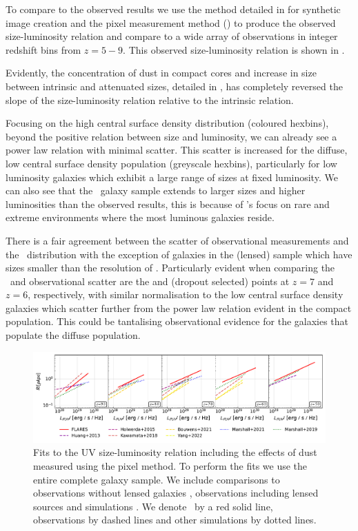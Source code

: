 To compare to the observed results we use the method detailed in  for synthetic image creation and the pixel measurement method () to produce the observed size-luminosity relation and compare to a wide array of observations in integer redshift bins from $z=5-9$. This observed size-luminosity relation is shown in . 

Evidently, the concentration of dust in compact cores and increase in size between intrinsic and attenuated sizes, detailed in , has completely reversed the slope of the size-luminosity relation relative to the intrinsic relation. 

Focusing on the high central surface density distribution (coloured hexbins), beyond the positive relation between size and luminosity, we can already see a power law relation with minimal scatter. This scatter is increased for the diffuse, low central surface density population (greyscale hexbins), particularly for low luminosity galaxies which exhibit a large range of sizes at fixed luminosity. We can also see that the \flares\ galaxy sample extends to larger sizes and higher luminosities than the observed results, this is because of \flares's focus on rare and extreme environments where the most luminous galaxies reside.

There is a fair agreement between the scatter of observational measurements and the \flares\ distribution with the exception of galaxies in the \cite{Kawamata_2018} (lensed) sample which have sizes smaller than the resolution of \flares. Particularly evident when comparing the \flares\ and observational scatter are the \cite{Grazian2011} and \cite{Hathi_2008} (dropout selected) points at $z=7$ and $z=6$, respectively, with similar normalisation to the low central surface density galaxies which scatter further from the power law relation evident in the compact population. This could be tantalising observational evidence for the galaxies that populate the diffuse population.

\begin{figure}
  \includegraphics[width=\linewidth]{Figures/FitHalfLightRadius_pix_FAKE.TH.FUV_sim_Total_default_Complete.pdf}
  \caption{Fits to the UV size-luminosity relation including the effects of dust measured using the pixel method. To perform the fits we use the entire complete galaxy sample. We include comparisons to observations without lensed galaxies \citep{Huang_2013, Holwerda_2015}, observations including lensed sources \citep{Kawamata_2018, Bouwens2021, Yang2022} and simulations \citep{Marshall2019, Marshall21}. We denote \flares\ by a red solid line, observations by dashed lines and other simulations by dotted lines.}
  \label{fig:fits_obscomp}
\end{figure}

